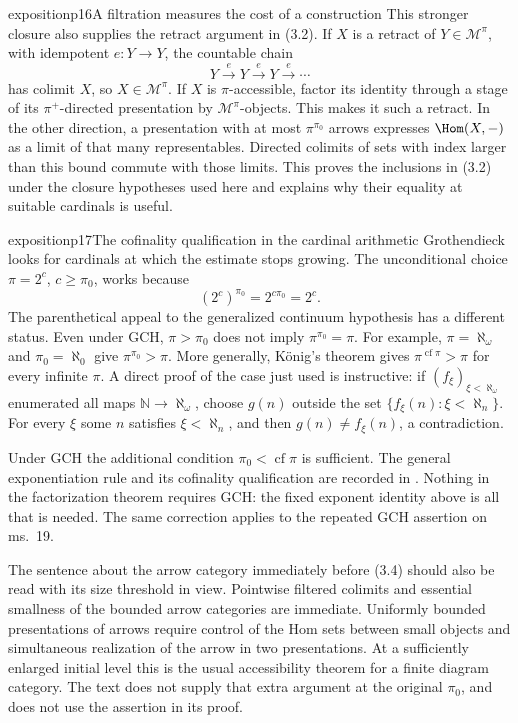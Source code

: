 \begin{dcomment}{exposition}{p16}{A filtration measures the cost of a construction}
This stronger closure also supplies the retract argument in (3.2). If $X$ is a retract of $Y\in\mathcal M^\pi$, with idempotent $e:Y\to Y$, the countable chain
\[
Y\xrightarrow{e}Y\xrightarrow{e}Y\xrightarrow{e}\cdots
\]
has colimit $X$, so $X\in\mathcal M^\pi$. If $X$ is $\pi$-accessible, factor its identity through a stage of its $\pi^+$-directed presentation by $\mathcal M^\pi$-objects. This makes it such a retract. In the other direction, a presentation with at most $\pi^{\pi_0}$ arrows expresses $\Hom(X,-)$ as a limit of that many representables. Directed colimits of sets with index larger than this bound commute with those limits. This proves the inclusions in (3.2) under the closure hypotheses used here and explains why their equality at suitable cardinals is useful.
\end{dcomment}

\begin{dcomment}{exposition}{p17}{The cofinality qualification in the cardinal arithmetic}
Grothendieck looks for cardinals at which the estimate stops growing. The unconditional choice $\pi=2^c$, $c\geq\pi_0$, works because
\[
(2^c)^{\pi_0}=2^{c\pi_0}=2^c.
\]
The parenthetical appeal to the generalized continuum hypothesis has a different status. Even under GCH, $\pi>\pi_0$ does not imply $\pi^{\pi_0}=\pi$. For example, $\pi=\aleph_\omega$ and $\pi_0=\aleph_0$ give $\pi^{\pi_0}>\pi$. More generally, K\"onig's theorem gives $\pi^{\operatorname{cf}\pi}>\pi$ for every infinite $\pi$. A direct proof of the case just used is instructive: if $(f_\xi)_{\xi<\aleph_\omega}$ enumerated all maps $\mathbb N\to\aleph_\omega$, choose $g(n)$ outside the set $\{f_\xi(n):\xi<\aleph_n\}$. For every $\xi$ some $n$ satisfies $\xi<\aleph_n$, and then $g(n)\ne f_\xi(n)$, a contradiction.

Under GCH the additional condition $\pi_0<\operatorname{cf}\pi$ is sufficient. The general exponentiation rule and its cofinality qualification are recorded in \citet[Theorems 10.12 and 11.7, Exercise 11.8]{Marks2026}. Nothing in the factorization theorem requires GCH: the fixed exponent identity above is all that is needed. The same correction applies to the repeated GCH assertion on ms.~19.

The sentence about the arrow category immediately before (3.4) should also be read with its size threshold in view. Pointwise filtered colimits and essential smallness of the bounded arrow categories are immediate. Uniformly bounded presentations of arrows require control of the Hom sets between small objects and simultaneous realization of the arrow in two presentations. At a sufficiently enlarged initial level this is the usual accessibility theorem for a finite diagram category. The text does not supply that extra argument at the original $\pi_0$, and does not use the assertion in its proof.
\end{dcomment}

